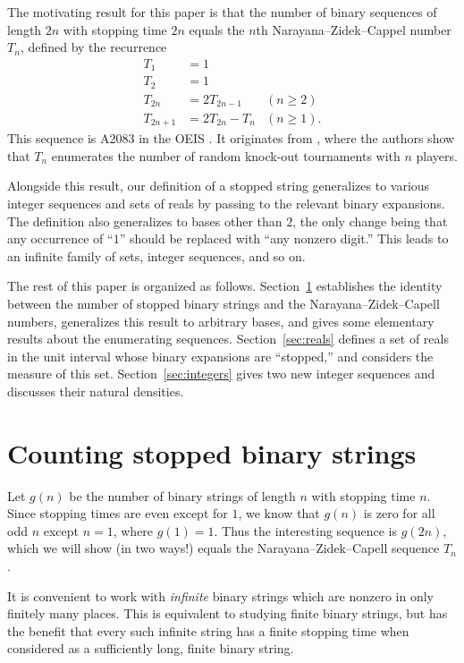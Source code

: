 \documentclass[12pt]{amsart}
\theoremstyle{definition}
\begin{document}
The motivating result for this paper is that the number of binary sequences of
length $2n$ with stopping time $2n$ equals the $n$th Narayana--Zidek--Cappel
number $T_n$, defined by the recurrence
\begin{align*}
    T_1 &= 1 & \\
    T_2 &= 1 & \\
    T_{2n} &= 2 T_{2n - 1} &(n \geq 2)\\
    T_{2n + 1} &= 2 T_{2n} - T_n  &(n \geq 1).
\end{align*}
This sequence is A2083 in the OEIS \cite{oeis}. It originates from
\cite{capell1970knock}, where the authors show that $T_n$ enumerates the number
of random knock-out tournaments with $n$ players.

Alongside this result, our definition of a stopped string generalizes to
various integer sequences and sets of reals by passing to the relevant binary
expansions. The definition also generalizes to bases other than $2$, the only
change being that any occurrence of ``$1$'' should be replaced with ``any
nonzero digit.'' This leads to an infinite family of sets, integer sequences,
and so on.

The rest of this paper is organized as follows. Section~\ref{sec:recs}
establishes the identity between the number of stopped binary strings and the
Narayana--Zidek--Capell numbers, generalizes this result to arbitrary bases,
and gives some elementary results about the enumerating sequences.
Section~\ref{sec:reals} defines a set of reals in the unit interval whose
binary expansions are ``stopped,'' and considers the measure of this set.
Section~\ref{sec:integers} gives two new integer sequences and discusses their
natural densities.

\section{Counting stopped binary strings}
\label{sec:recs}

Let $g(n)$ be the number of binary strings of length $n$ with stopping time
$n$. Since stopping times are even except for $1$, we know that $g(n)$ is zero
for all odd $n$ except $n = 1$, where $g(1) = 1$. Thus the interesting sequence
is $g(2n)$, which we will show (in two ways!) equals the
Narayana--Zidek--Capell sequence $T_n$.

It is convenient to work with \emph{infinite} binary strings which are nonzero
in only finitely many places. This is equivalent to studying finite binary
strings, but has the benefit that every such infinite string has a finite
stopping time when considered as a sufficiently long, finite binary string.
\end{document}
